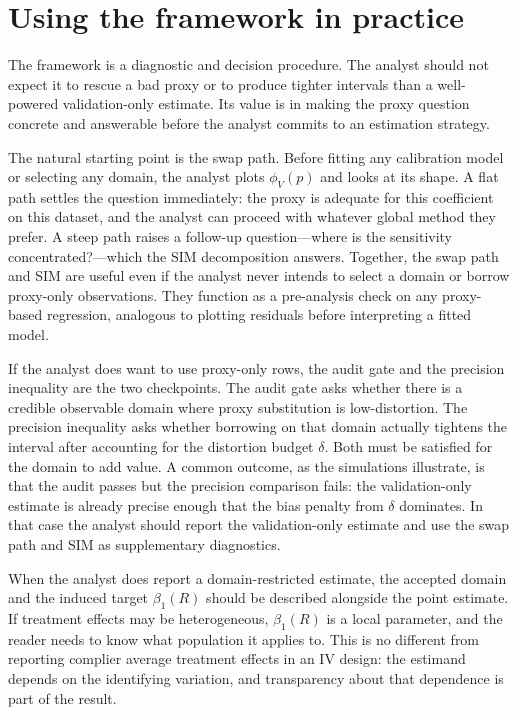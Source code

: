 \documentclass[11pt]{article}
\newcommand{\1}{\mathbf{1}}
\begin{document}
\section{Using the framework in practice}

The framework is a diagnostic and decision procedure. The analyst should not expect it to rescue a bad proxy or to produce tighter intervals than a well-powered validation-only estimate. Its value is in making the proxy question concrete and answerable before the analyst commits to an estimation strategy.

The natural starting point is the swap path. Before fitting any calibration model or selecting any domain, the analyst plots $\phi_V(p)$ and looks at its shape. A flat path settles the question immediately: the proxy is adequate for this coefficient on this dataset, and the analyst can proceed with whatever global method they prefer. A steep path raises a follow-up question---where is the sensitivity concentrated?---which the SIM decomposition answers. Together, the swap path and SIM are useful even if the analyst never intends to select a domain or borrow proxy-only observations. They function as a pre-analysis check on any proxy-based regression, analogous to plotting residuals before interpreting a fitted model.

If the analyst does want to use proxy-only rows, the audit gate and the precision inequality are the two checkpoints. The audit gate asks whether there is a credible observable domain where proxy substitution is low-distortion. The precision inequality asks whether borrowing on that domain actually tightens the interval after accounting for the distortion budget $\delta$. Both must be satisfied for the domain to add value. A common outcome, as the simulations illustrate, is that the audit passes but the precision comparison fails: the validation-only estimate is already precise enough that the bias penalty from $\delta$ dominates. In that case the analyst should report the validation-only estimate and use the swap path and SIM as supplementary diagnostics.

When the analyst does report a domain-restricted estimate, the accepted domain and the induced target $\beta_1(R)$ should be described alongside the point estimate. If treatment effects may be heterogeneous, $\beta_1(R)$ is a local parameter, and the reader needs to know what population it applies to. This is no different from reporting complier average treatment effects in an IV design: the estimand depends on the identifying variation, and transparency about that dependence is part of the result.
\end{document}
